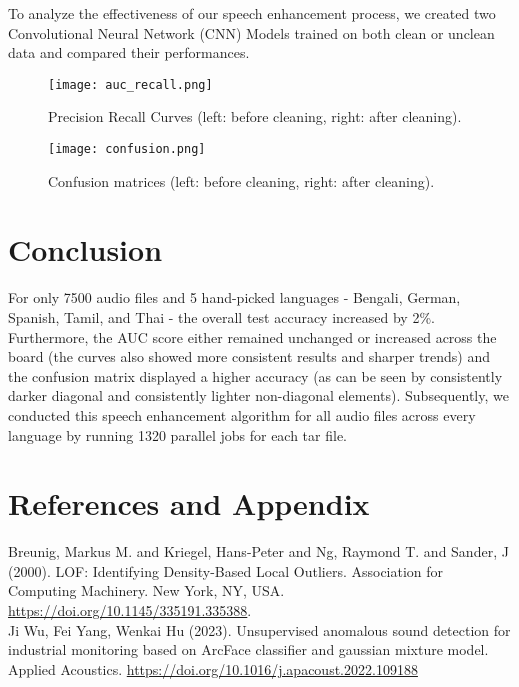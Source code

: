 \documentclass[letterpaper, 12pt]{article}
\begin{document}
To analyze the effectiveness of our speech enhancement process, we created two Convolutional Neural Network (CNN) Models trained on both clean or unclean data and compared their performances.

\begin{figure}[h]
    \centering
    \texttt{[image: auc\_recall.png]}
    \caption{Precision Recall Curves (left: before cleaning, right: after cleaning).}
\end{figure} 

\begin{figure}[h]
    \centering
    \texttt{[image: confusion.png]}
    \caption{Confusion matrices (left: before cleaning, right: after cleaning).}
\end{figure} 

\newpage
\section{Conclusion}

\noindent For only 7500 audio files and 5 hand-picked languages - Bengali, German, Spanish, Tamil, and Thai - the overall test accuracy increased by 2\%. Furthermore, the AUC score either remained unchanged or increased across the board (the curves also showed more consistent results and sharper trends) and the confusion matrix displayed a higher accuracy (as can be seen by consistently darker diagonal and consistently lighter non-diagonal elements). Subsequently, we conducted this speech enhancement algorithm for all audio files across every language by running 1320 parallel jobs for each tar file.

\newpage
\section{References and Appendix}

\noindent Breunig, Markus M. and Kriegel, Hans-Peter and Ng, Raymond T. and Sander, J (2000). LOF: Identifying Density-Based Local Outliers. Association for Computing Machinery. New York, NY, USA. \url{https://doi.org/10.1145/335191.335388}.\\

\noindent Ji Wu, Fei Yang, Wenkai Hu (2023). Unsupervised anomalous sound detection for industrial monitoring based on ArcFace classifier and gaussian mixture model. Applied Acoustics. \url{https://doi.org/10.1016/j.apacoust.2022.109188}\\
\end{document}
